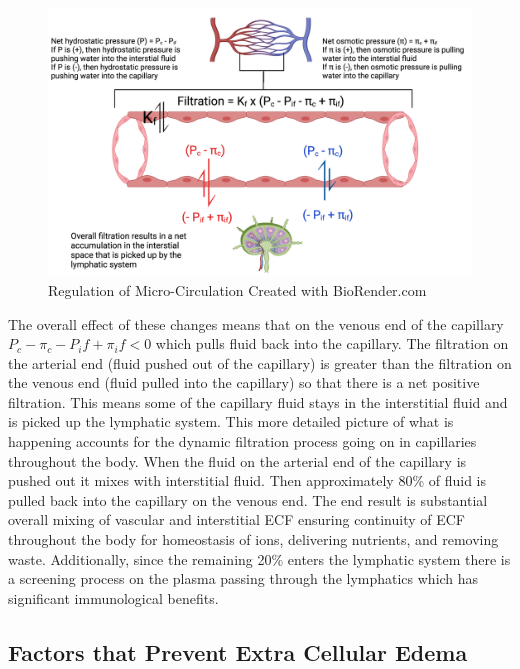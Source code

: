\begin{figure}[!h]
    \centering
    \includegraphics[width=1\linewidth]{./figure/Microcirculation_Regulation.png}
    \caption{Regulation of Micro-Circulation \footnotesize{Created with BioRender.com}}
    \label{fig:Microcirculation_Regulation}
\end{figure}

The overall effect of these changes means that on the venous end of the capillary $P_c - \pi_c - P_if + \pi_if < 0$ which pulls fluid back into the capillary.  The filtration on the arterial end (fluid pushed out of the capillary) is greater than the filtration on the venous end (fluid pulled into the capillary) so that there is a net positive filtration. This means some of the capillary fluid stays in the interstitial fluid and is picked up the lymphatic system. This more detailed picture of what is happening accounts for the dynamic filtration process going on in capillaries throughout the body. When the fluid on the arterial end of the capillary is pushed out it mixes with interstitial fluid. Then approximately 80\% of fluid is pulled back into the capillary on the venous end. The end result is substantial overall mixing of vascular and interstitial ECF ensuring continuity of ECF throughout the body for homeostasis of ions, delivering nutrients, and removing waste. Additionally, since the remaining 20\% enters the lymphatic system there is a screening process on the plasma passing through the lymphatics which has significant immunological benefits.

\subsection{Factors that Prevent Extra Cellular Edema}

